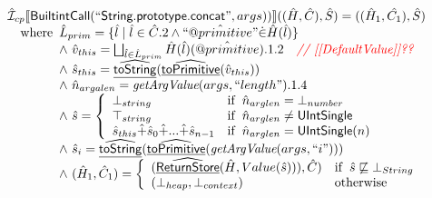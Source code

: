 \[
\begin{array}{l}

\hat{\mathcal{I}} _{cp}\llbracket \mbox{\textsf{BuiltintCall}}(``\mbox{\textsf{String.prototype.concat}}",args))\rrbracket((\hat{H},\hat{C}), \hat{S})
  = ((\hat{H}_1, \hat{C_1}), \hat{S})\\
\quad{\rm where}\begin{array}[t]{l} 
  \hat{L}_{prim} = \{ \hat{l} \mid \hat{l} \in \hat{C}.2 \land ``\hat{@primitive}" \dot{\in}\hat{H}(\hat{l}) \}\\
  \land\ \hat{v}_{this} = \bigsqcup_{\hat{l} \in \hat{L}_{prim}} \hat{H}(\hat{l})(\hat{@primitive}).1.2
    \quad\textit{{\color{red}// [[DefaultValue]]??}}\\
  \land\ \hat{s}_{this} = \widehat{\underline{\sf toString}}(\widehat{\underline{\sf toPrimitive}}(\hat{v}_{this}))\\
  \land\ \hat{n}_{argalen} = \emph{getArgValue}(args, ``length").1.4\\
  \land\ \hat{s} = \left\{\begin{array}{ll}
      \bot_{string}& {\rm if}\begin{array}[t]{l}\hat{n}_{arglen} = \bot_{number}\end{array}\\
      \top_{string}& {\rm if}\begin{array}[t]{l}\hat{n}_{arglen} \neq \mbox{\textsf{UIntSingle}}\end{array}\\
      \hat{s}_{this} \hat{+} \hat{s}_0 \hat{+} ... \hat{+} \hat{s}_{n-1}& {\rm if}\begin{array}[t]{l}\hat{n}_{arglen} = \mbox{\textsf{UIntSingle}}(n)\end{array}
    \end{array}\right.\\
    \land\ \hat{s}_i = \widehat{\underline{\sf toString}}(\widehat{\underline{\sf toPrimitive}}(\emph{getArgValue}(args, ``i")))\\
  \land\ (\hat{H}_1, \hat{C}_1) = 
    \left\{\begin{array}{ll}
      (\widehat{\underline{\sf ReturnStore}}(\hat{H}, Value(\hat{s}))), \hat{C})
      & {\rm if}\begin{array}[t]{l}\hat{s} \not\sqsubseteq \bot_{String}\end{array}\\
      (\bot_{heap}, \bot_{context}) & {\rm otherwise} \\
    \end{array}\right.\\
  \end{array}\\
\\\\



\end{array}\]
